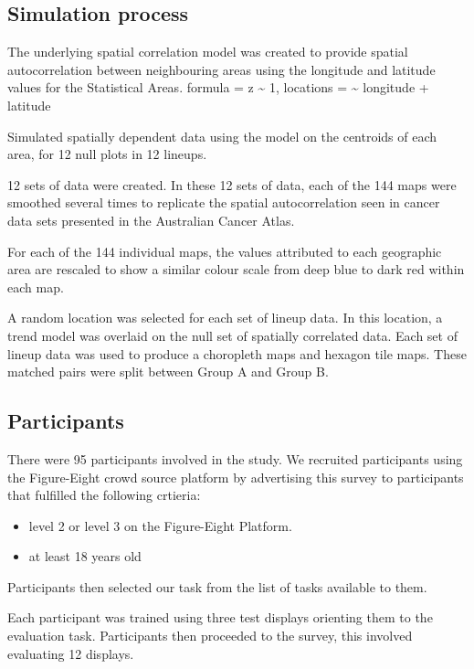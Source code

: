 \documentclass[conference,final,]{IEEEtran}
\providecommand{\tightlist}{%
  \setlength{\itemsep}{0pt}\setlength{\parskip}{0pt}}
\begin{document}
\hypertarget{simulation-process}{%
\subsection{Simulation process}\label{simulation-process}}

The underlying spatial correlation model was created to provide spatial
autocorrelation between neighbouring areas using the longitude and
latitude values for the Statistical Areas. formula = z \textasciitilde{}
1, locations = \textasciitilde{} longitude + latitude

Simulated spatially dependent data using the model on the centroids of
each area, for 12 null plots in 12 lineups.

12 sets of data were created. In these 12 sets of data, each of the 144
maps were smoothed several times to replicate the spatial
autocorrelation seen in cancer data sets presented in the Australian
Cancer Atlas.

For each of the 144 individual maps, the values attributed to each
geographic area are rescaled to show a similar colour scale from deep
blue to dark red within each map.

A random location was selected for each set of lineup data. In this
location, a trend model was overlaid on the null set of spatially
correlated data. Each set of lineup data was used to produce a
choropleth maps and hexagon tile maps. These matched pairs were split
between Group A and Group B.

\hypertarget{participants}{%
\subsection{Participants}\label{participants}}

There were 95 participants involved in the study. We recruited
participants using the Figure-Eight crowd source platform by advertising
this survey to participants that fulfilled the following crtieria:

\begin{itemize}
\tightlist
\item
  level 2 or level 3 on the Figure-Eight Platform.
\item
  at least 18 years old
\end{itemize}

Participants then selected our task from the list of tasks available to
them.

Each participant was trained using three test displays orienting them to
the evaluation task. Participants then proceeded to the survey, this
involved evaluating 12 displays.
\end{document}
